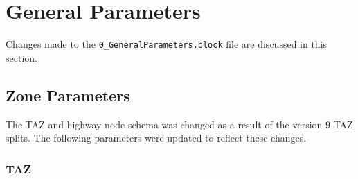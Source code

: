 \documentclass[
  letterpaper,
  DIV=11,
  numbers=noendperiod,
  titlepage=false]{scrreprt}
\begin{document}

\hypertarget{general-parameters}{%
\chapter{General Parameters}\label{general-parameters}}

Changes made to the \texttt{0\_GeneralParameters.block} file are
discussed in this section.

\hypertarget{zone-parameters}{%
\section{Zone Parameters}\label{zone-parameters}}

The TAZ and highway node schema was changed as a result of the version 9
TAZ splits. The following parameters were updated to reflect these
changes.

\hypertarget{taz}{%
\subsection{TAZ}\label{taz}}
\end{document}
